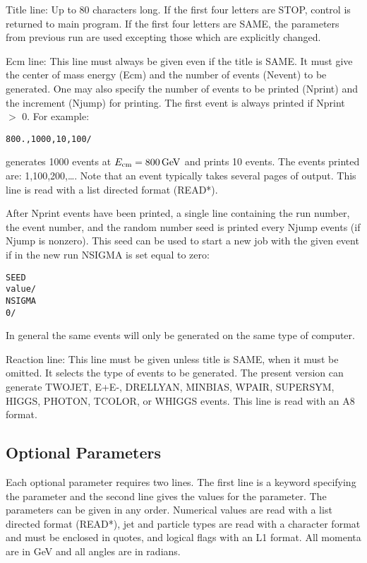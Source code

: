       Title line: Up to 80 characters long. If the first four letters
are STOP, control is returned to main program. If the first four letters
are SAME, the parameters from previous run are used excepting those
which are explicitly changed.

      Ecm line: This line must always be given even if the title is
SAME. It must give the center of mass energy (Ecm) and the number of
events (Nevent) to be generated. One may also specify the number of
events to be printed (Nprint) and the increment (Njump) for printing.
The first event is always printed if Nprint $>$ 0. For example:
\begin{verbatim}
800.,1000,10,100/
\end{verbatim}
generates 1000 events at $E_{\rm cm} = 800\,{\rm GeV}$ and prints 10
events. The events printed are: 1,100,200,\dots. Note that an event
typically takes several pages of output. This line is read with a list
directed format (READ*).

     After Nprint events have been printed, a single line containing the
run number, the event number, and the random number seed is printed
every Njump events (if Njump is nonzero). This seed can be used to start
a new job with the given event if in the new run NSIGMA is set equal to
zero:
\begin{verbatim}
SEED
value/
NSIGMA
0/
\end{verbatim}
In general the same events will only be generated on the same type of
computer.

      Reaction line: This line must be given unless title is SAME, when
it must be omitted. It selects the type of events to be generated. The
present version can generate TWOJET, E+E-, DRELLYAN, MINBIAS, WPAIR,
SUPERSYM, HIGGS, PHOTON, TCOLOR, or WHIGGS events. This line is read
with an A8 format.

\subsection{Optional Parameters}

      Each optional parameter requires two lines.
The first line is a keyword specifying the parameter and the second
line gives the values for the parameter. The parameters can be given in
any order. Numerical values are read with a list directed format
(READ*), jet and particle types are read with a character format and
must be enclosed in quotes, and logical flags with an L1 format. All
momenta are in GeV and all angles are in radians.

